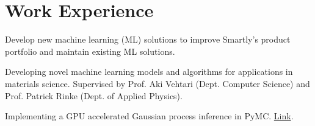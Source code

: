 \documentclass[]{deedy-resume}
\begin{document}
\begin{minipage}[t]{0.62\textwidth} 


\section{Work Experience}
\vspace{\topsep} %
\begin{tightemize}
\item Develop new machine learning (ML) solutions to improve Smartly's product portfolio and maintain existing ML solutions. 
\end{tightemize}
\sectionsep

\vspace{\topsep} %
\begin{tightemize}
\item Developing novel machine learning models and algorithms for applications in materials science. Supervised by Prof. Aki Vehtari (Dept. Computer Science) and Prof. Patrick Rinke (Dept. of Applied Physics).
\end{tightemize}
\sectionsep

\vspace{\topsep} %
\begin{tightemize}
\item Implementing a GPU accelerated Gaussian process inference in PyMC. \href{https://summerofcode.withgoogle.com/proposals/details/D0vXBd2x}{Link}.
\end{tightemize}
\sectionsep

\sectionsep


\end{minipage}
\end{document}
